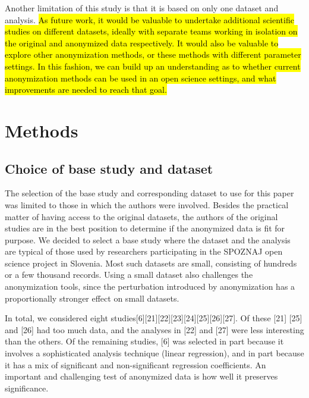 \documentclass[10pt]{article}
\newcommand{\mycite}[1]{[#1]}
\begin{document}
Another limitation of this study is that it is based on only one dataset and analysis. \hl{As future work, it would be valuable to undertake additional scientific studies on different datasets, ideally with separate teams working in isolation on the original and anonymized data respectively. It would also be valuable to explore other anonymization methods, or these methods with different parameter settings. In this fashion, we can build up an understanding as to whether current anonymization methods can be used in an open science settings, and what improvements are needed to reach that goal.}



\section*{Methods}

\subsection*{Choice of base study and dataset}
\label{sec:base-study}

The selection of the base study and corresponding dataset to use for this paper was limited to those in which the authors were involved. Besides the practical matter of having access to the original datasets, the authors of the original studies are in the best position to determine if the anonymized data is fit for purpose. We decided to select a base study where the dataset and the analysis are typical of those used by researchers participating in the SPOZNAJ open science project in Slovenia. Most such datasets are small, consisting of hundreds or a few thousand records. Using a small dataset also challenges the anonymization tools, since the perturbation introduced by anonymization has a proportionally stronger effect on small datasets.

In total, we considered eight studies\mycite{6}\mycite{21}\mycite{22}\mycite{23}\mycite{24}\mycite{25}\mycite{26}\mycite{27}. Of these \mycite{21} \mycite{25} and \mycite{26} had too much data, and the analyses in \mycite{22} and \mycite{27} were less interesting than the others. Of the remaining studies, \mycite{6} was selected in part because it involves a sophisticated analysis technique (linear regression), and in part because it has a mix of significant and non-significant regression coefficients. An important and challenging test of  anonymized data is how well it preserves significance.
\end{document}
